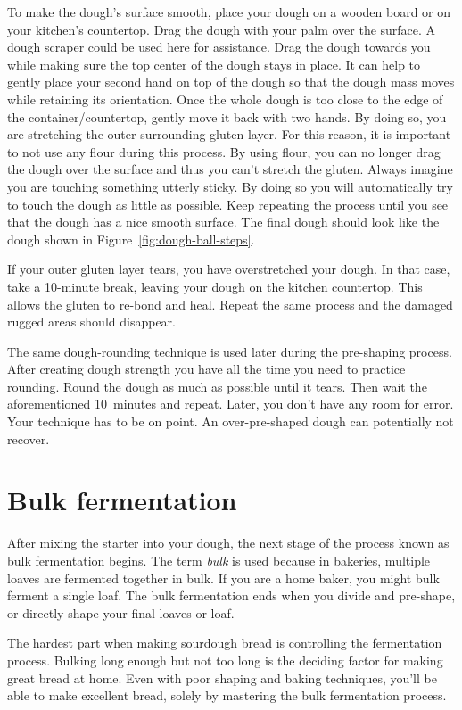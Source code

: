 To make the dough's surface smooth, place your dough on a wooden board or
on your kitchen's countertop. Drag the dough with your palm over the surface.
A dough scraper could be used here for assistance.
Drag the dough towards you while making sure the top center of the dough stays in place.
It can help to gently place your second hand on top of the dough so that
the dough mass moves while retaining its orientation. Once the whole dough
is too close to the edge of the container/countertop, gently move it back
with two hands. By doing so, you are stretching the outer surrounding gluten layer.
For this reason, it is important to not use any flour during this process.
By using flour, you can no longer drag the dough over the surface and thus
you can't stretch the gluten. Always imagine you are touching something utterly sticky.
By doing so you will automatically try to touch the dough as little
as possible. Keep repeating the process until you see that the dough
has a nice smooth surface. The final dough should look like the dough
shown in Figure~\ref{fig:dough-ball-steps}.

If your outer gluten layer tears, you have overstretched your dough. In
that case, take a 10-minute break, leaving your dough on the kitchen countertop.
This allows the gluten to re-bond and heal. Repeat the same process
and the damaged rugged areas should disappear.

The same dough-rounding technique is used later during
the pre-shaping process. After creating dough strength you
have all the time you need to practice rounding. Round the dough
as much as possible until it tears. Then wait the aforementioned 10~minutes and repeat.
Later, you don't have any room for error. Your technique has to be on point.
An over-pre-shaped dough can potentially not recover.

\section{Bulk fermentation}%
\label{section:bulk-fermentation}

After mixing the starter into your dough, the next stage of
the process known as bulk fermentation begins. The term
\emph{bulk} is used because in bakeries, multiple loaves are fermented
together in bulk. If you are a home baker, you might bulk
ferment a single loaf. The bulk fermentation ends when you
divide and pre-shape, or directly shape your final loaves or loaf.

The hardest part when making sourdough bread is controlling
the fermentation process. Bulking long enough but not too
long is the deciding factor for making great bread at home.
Even with poor shaping and baking techniques, you'll be able
to make excellent bread, solely by mastering the bulk
fermentation process.

